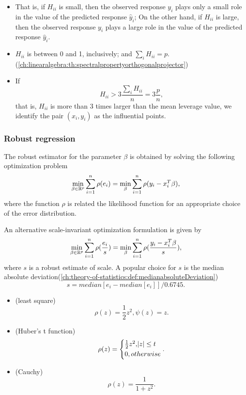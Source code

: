 \begin{refsection}
\begin{note}\hfill
\begin{itemize}
	\item That is, if $H_{ii}$ is small, then the observed response $y_i$ plays only a small role in the value of the predicted response $\hat{y}_i$; On the other hand, if $H_{ii}$ is large, then the observed response $y_i$ plays a large role in the value of the predicted response $\hat{y}_i$.
	\item $H_{ii}$ is between 0 and 1, inclusively; and $\sum_i H_{ii} = p$.(\autoref{ch:linearalgebra:th:spectralpropertyorthogonalprojector})
	\item If $$H_{ii} > 3\frac{\sum_i H_{ii}}{n} = 3\frac{p}{n},$$
	that is, $H_{ii}$ is more than 3 times larger than the mean leverage value, we identify the pair $(x_i,y_i)$ as the influential points. 
\end{itemize}	
\end{note}






\subsubsection{Robust regression}



\begin{lemma}
The robust estimator for the parameter $\beta$ is obtained by solving the following optimization problem	
$$\min_{\beta \in \mathbb{R}^p} \sum_{i=1}^{n} \rho(e_i) = \min_{\beta} \sum_{i=1}^{n} \rho(y_i - x_i^T\beta),$$
where the function $\rho$ is related the likelihood function for an appropriate choice of the error distribution.

An alternative scale-invariant optimization formulation is given by
$$\min_{\beta \in \mathbb{R}^p} \sum_{i=1}^{n} \rho(\frac{e_i}{s}) = \min_{\beta} \sum_{i=1}^{n} \rho(\frac{y_i - x_i^T\beta}{s}),$$
where $s$ is a robust estimate of scale. A popular choice for $s$ is the median absolute deviation(\autoref{ch:theory-of-statistics:def:medianabsoluteDeviation})
$$s = median[e_i - median[e_i]]/0.6745.$$	
\end{lemma}


\begin{example}\hfill
	\begin{itemize}
		\item (least square) $$\rho(z) = \frac{1}{2}z^2, \psi(z) = z.$$
		\item (Huber's t function)
		$$\rho(z) = 
		\begin{cases*}
		\frac{1}{2}z^2, \abs{z} \leq t \\
		0, otherwise
		\end{cases*}.$$
		\item (Cauchy)
		$$\rho(z) = \frac{1}{1+z^2}.$$ 
	\end{itemize}
\end{example}




\end{refsection}
